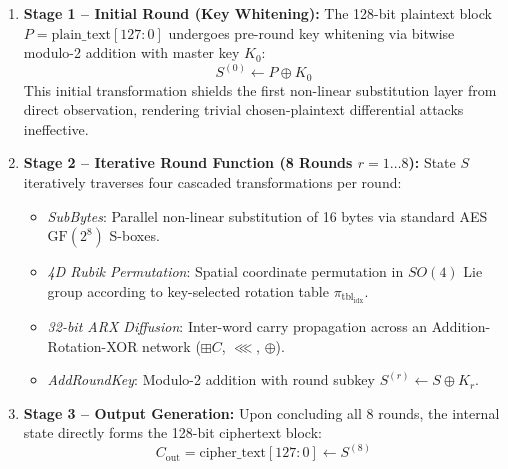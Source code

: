 \documentclass[10pt,twocolumn]{article}
\begin{document}
\begin{enumerate}
    \item \textbf{Stage 1 -- Initial Round (Key Whitening):} The 128-bit plaintext block $P = \text{plain\_text}[127:0]$ undergoes pre-round key whitening via bitwise modulo-2 addition with master key $K_0$:
    \begin{equation}
        S^{(0)} \leftarrow P \oplus K_0
    \end{equation}
    This initial transformation shields the first non-linear substitution layer from direct observation, rendering trivial chosen-plaintext differential attacks ineffective.
    
    \item \textbf{Stage 2 -- Iterative Round Function (8 Rounds $r = 1 \dots 8$):} State $S$ iteratively traverses four cascaded transformations per round:
    \begin{itemize}
        \item \emph{SubBytes}: Parallel non-linear substitution of 16 bytes via standard AES $\text{GF}(2^8)$ S-boxes.
        \item \emph{4D Rubik Permutation}: Spatial coordinate permutation in $SO(4)$ Lie group according to key-selected rotation table $\pi_{\text{tbl}_{\text{idx}}}$.
        \item \emph{32-bit ARX Diffusion}: Inter-word carry propagation across an Addition-Rotation-XOR network ($\boxplus C$, $\lll$, $\oplus$).
        \item \emph{AddRoundKey}: Modulo-2 addition with round subkey $S^{(r)} \leftarrow S \oplus K_r$.
    \end{itemize}
    
    \item \textbf{Stage 3 -- Output Generation:} Upon concluding all 8 rounds, the internal state directly forms the 128-bit ciphertext block:
    \begin{equation}
        C_{\text{out}} = \text{cipher\_text}[127:0] \leftarrow S^{(8)}
    \end{equation}
\end{enumerate}
\end{document}
